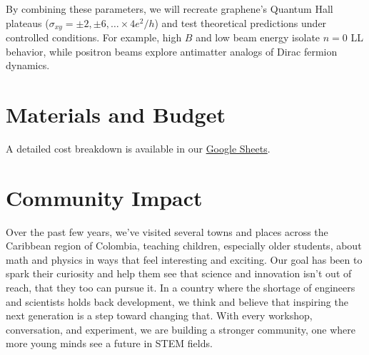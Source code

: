 \documentclass[12pt, a4paper]{article}
\begin{document}
By combining these parameters, we will recreate graphene's Quantum Hall plateaus (\(\sigma_{xy} = \pm2, \pm6, \ldots \times 4e^2/h\)) and test theoretical predictions under controlled conditions. For example, high \(B\) and low beam energy isolate \(n=0\) LL behavior, while positron beams explore antimatter analogs of Dirac fermion dynamics.

\section{Materials and Budget}
A detailed cost breakdown is available in our \href{https://docs.google.com/spreadsheets/d/1yHHGXo7aPC6-99GpaHHJ5hi_KQ2__5M-3WwTXWNNCyk/edit?usp=sharing}{Google Sheets}.

\section{Community Impact}
Over the past few years, we've visited several towns and places across the Caribbean region of Colombia, teaching children, especially older students, about math and physics in ways that feel interesting and exciting. Our goal has been to spark their curiosity and help them see that science and innovation isn't out of reach, that they too can pursue it. In a country where the shortage of engineers and scientists holds back development, we think and believe that inspiring the next generation is a step toward changing that. With every workshop, conversation, and experiment, we are building a stronger community, one where more young minds see a future in STEM fields.

\printbibliography
\end{document}
